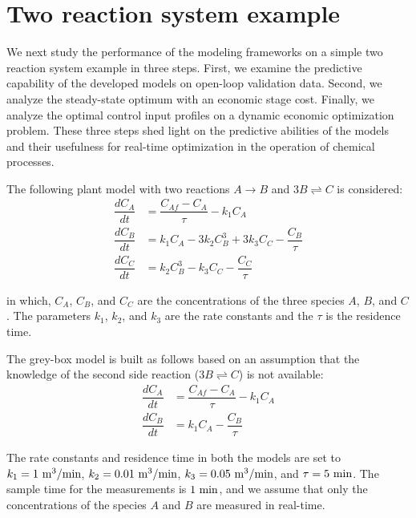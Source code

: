 \documentclass[10pt]{article}
\begin{document}
\section{Two reaction system example}

We next study the performance of the modeling frameworks on a simple two reaction system example in three steps. First, we examine the predictive capability of the developed models on open-loop validation data. Second, we analyze the steady-state optimum with an economic stage cost. Finally, we analyze the optimal control input profiles on a dynamic economic optimization problem. These three steps shed light on the predictive abilities of the models and their usefulness for real-time optimization in the operation of chemical processes.

The following plant model with two reactions $A \rightarrow B$ and $3B \rightleftharpoons C$ is considered:
\begin{align*}
  \dfrac{dC_A}{dt} &= \dfrac{C_{Af} - C_A}{\tau} - k_1C_A\\
  \dfrac{dC_B}{dt} &= k_1C_A - 3k_2C^3_B + 3k_3C_C- \dfrac{C_B}{\tau}\\
  \dfrac{dC_C}{dt} &= k_2C^3_B - k_3C_C - \dfrac{C_C}{\tau}
\end{align*}

in which, $C_A$, $C_B$, and $C_C$ are the concentrations of the three species $A$, $B$, and $C$. The parameters $k_1$, $k_2$, and $k_3$ are the rate constants and the $\tau$ is the residence time.

The grey-box model is built as follows based on an assumption that the knowledge of the second side reaction ($3B \rightleftharpoons C $) is not available:
\begin{align*}
  \dfrac{dC_A}{dt} &= \dfrac{C_{Af} - C_A}{\tau} - k_1C_A\\
  \dfrac{dC_B}{dt} &= k_1C_A - \dfrac{C_B}{\tau}
\end{align*}

The rate constants and residence time in both the models are set to 
$k_1 = 1 \ \textnormal{m}^3/\textnormal{min}$, $k_2 = 0.01 \ \textnormal{m}^3/\textnormal{min}$, $k_3 = 0.05 \ \textnormal{m}^3/\textnormal{min}$, and $\tau = 5 \ \textnormal{min}$. The sample time for the measurements is $1 \ \textnormal{min}$, and we assume that only the concentrations of the species $A$ and $B$ are measured in real-time.
\end{document}
